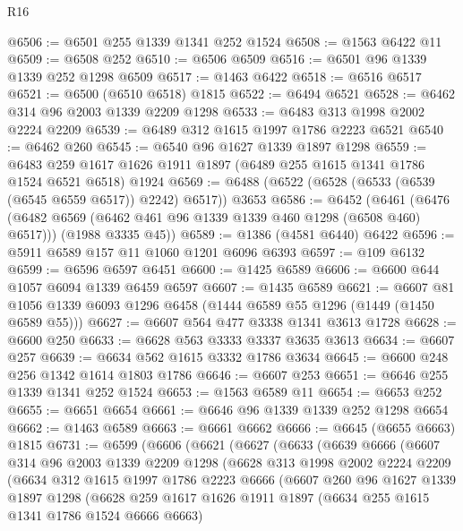 \begin{lexlean}{R16}
\begin{coremodule}
@6506 := @6501 @255 @1339 @1341 @252 @1524
@6508 := @1563 @6422 @11
@6509 := @6508 @252
@6510 := @6506 @6509
@6516 := @6501 @96 @1339 @1339 @252 @1298 @6509
@6517 := @1463 @6422
@6518 := @6516 @6517
@6521 := @6500 (@6510 @6518) @1815
@6522 := @6494 @6521
@6528 := @6462 @314 @96 @2003 @1339 @2209 @1298
@6533 := @6483 @313 @1998 @2002 @2224 @2209
@6539 := @6489 @312 @1615 @1997 @1786 @2223 @6521
@6540 := @6462 @260
@6545 := @6540 @96 @1627 @1339 @1897 @1298
@6559 := @6483 @259 @1617 @1626 @1911 @1897 (@6489 @255 @1615 @1341 @1786 @1524 @6521 @6518) @1924
@6569 := @6488 (@6522 (@6528 (@6533 (@6539 (@6545 @6559 @6517)) @2242) @6517)) @3653
@6586 := @6452
    (@6461
      (@6476 (@6482 @6569 (@6462 @461 @96 @1339 @1339 @460 @1298 (@6508 @460) @6517)))
      (@1988 @3335 @45))
@6589 := @1386 (@4581 @6440) @6422
@6596 := @5911 @6589 @157 @11 @1060 @1201 @6096 @6393
@6597 := @109 @6132
@6599 := @6596 @6597 @6451
@6600 := @1425 @6589
@6606 := @6600 @644 @1057 @6094 @1339 @6459 @6597
@6607 := @1435 @6589
@6621 := @6607 @81 @1056 @1339 @6093 @1296 @6458 (@1444 @6589 @55 @1296 (@1449 (@1450 @6589 @55)))
@6627 := @6607 @564 @477 @3338 @1341 @3613 @1728
@6628 := @6600 @250
@6633 := @6628 @563 @3333 @3337 @3635 @3613
@6634 := @6607 @257
@6639 := @6634 @562 @1615 @3332 @1786 @3634
@6645 := @6600 @248 @256 @1342 @1614 @1803 @1786
@6646 := @6607 @253
@6651 := @6646 @255 @1339 @1341 @252 @1524
@6653 := @1563 @6589 @11
@6654 := @6653 @252
@6655 := @6651 @6654
@6661 := @6646 @96 @1339 @1339 @252 @1298 @6654
@6662 := @1463 @6589
@6663 := @6661 @6662
@6666 := @6645 (@6655 @6663) @1815
@6731 := @6599
    (@6606
      (@6621
        (@6627
          (@6633
            (@6639
              @6666
              (@6607
                @314
                @96
                @2003
                @1339
                @2209
                @1298
                (@6628
                  @313
                  @1998
                  @2002
                  @2224
                  @2209
                  (@6634
                    @312
                    @1615
                    @1997
                    @1786
                    @2223
                    @6666
                    (@6607
                      @260
                      @96
                      @1627
                      @1339
                      @1897
                      @1298
                      (@6628
                        @259
                        @1617
                        @1626
                        @1911
                        @1897
                        (@6634 @255 @1615 @1341 @1786 @1524 @6666 @6663)

\end{coremodule}
\end{lexlean}

